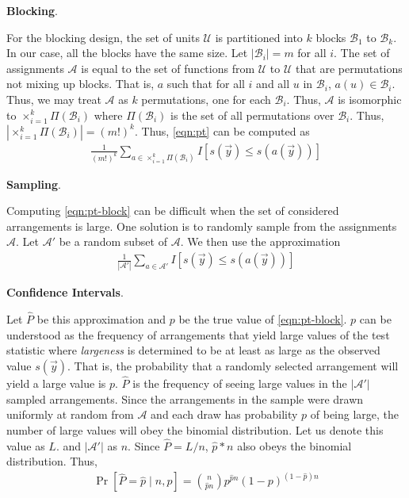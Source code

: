 \documentclass{article}
\makeatletter
\newcommand\gobblepars{\@ifnextchar\par {\expandafter\gobblepars\@gobble}{}}
\renewcommand{\paragraph}[1]{\smallskip\noindent\textbf{#1}.\ \ \gobblepars}
\newcommand*{\given}{\mathop{{|}}}
\newcommand{\mc}{\mathcal}
\newcommand{\bigtimes}{\times}
\makeatother
\begin{document}
\paragraph{Blocking}
For the blocking design, the set of units $\mc{U}$ is partitioned into $k$ blocks $\mc{B}_1$ to $\mc{B}_k$.  In our case, all the blocks have the same size.  Let $|\mc{B}_i| = m$ for all $i$.
The set of assignments $\mc{A}$ is equal to the set of functions from $\mc{U}$ to $\mc{U}$ that are permutations not mixing up blocks.  That is, $a$ such that for all $i$ and all $u$ in $\mc{B}_i$, $a(u) \in \mc{B}_i$.  Thus, we may treat $\mc{A}$ as $k$ permutations, one for each $\mc{B}_i$.  Thus, $\mc{A}$ is isomorphic to $\bigtimes_{i = 1}^{k} \Pi(\mc{B}_i)$ where
$\Pi(\mc{B}_i)$ is the set of all permutations over $\mc{B}_i$.  Thus, $|\bigtimes_{i = 1}^{k} \Pi(\mc{B}_i)| = (m!)^k$.
Thus, \eqref{eqn:pt} can be computed as
\begin{align}
\frac{1}{(m!)^k} \sum_{a \in \bigtimes_{i = 1}^{k} \Pi(\mc{B}_i)} I[s(\vec{y}) \leq s(a(\vec{y}))] 
\label{eqn:pt-block}
\end{align}

\paragraph{Sampling}
Computing \eqref{eqn:pt-block} can be difficult when the set of considered arrangements is large.  One solution is to randomly sample from the assignments $\mc{A}$.  Let $\mc{A}'$ be a random subset of $\mc{A}$.  We then use the approximation
\begin{align}
\frac{1}{|\mc{A}'|} \sum_{a \in \mc{A}'} I[s(\vec{y}) \leq s(a(\vec{y}))] \label{eqn:pt-approx}
\end{align}

\paragraph{Confidence Intervals}
Let $\hat{P}$ be this approximation and $p$ be the true value of \eqref{eqn:pt-block}.  $p$ can be understood as the frequency of arrangements that yield large values of the test statistic where \emph{largeness} is determined to be at least as large as the observed value $s(\vec{y})$.  That is, the probability that a randomly selected arrangement will yield a large value is $p$.  $\hat{P}$ is the frequency of seeing large values in the $|\mc{A}'|$ sampled arrangements.  Since the arrangements in the sample were drawn uniformly at random from $\mc{A}$ and each draw has probability $p$ of being large, the number of large values will obey the binomial distribution.  Let us denote this value as $L$.
and $|\mc{A}'|$ as $n$.
Since $\hat{P} = L/n$, $\hat{p}*n$ also obeys the binomial distribution.  Thus,
\begin{align}
\Pr[ \hat{P} = \hat{p} \given n, p] = \binom{n}{\hat{p}n} p^{\hat{p}n} (1-p)^{(1-\hat{p})n}
\end{align}
\end{document}
